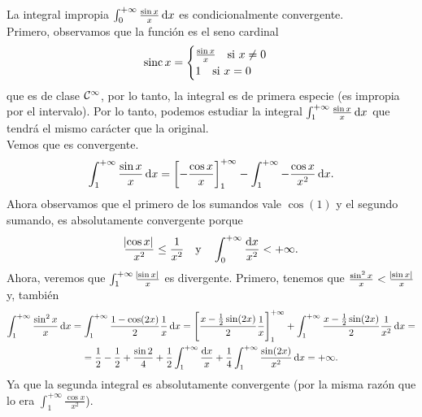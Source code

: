\begin{example*}
    La integral impropia $\int^{+\infty}_0 \frac{\sin x}{x} \dif x$ es
    condicionalmente convergente. \\
    Primero, observamos que la función es el seno cardinal
    \[
        \operatorname{sinc} x = \begin{cases} \frac{\sin x}{x} \quad \text{si } x \neq 0 \\
            1 \quad \text{si } x = 0 \end{cases}
    \]
    que es de clase $\mathcal{C}^{\infty}$, por lo tanto, la integral es de primera especie
    (es impropia por el intervalo). Por lo tanto, podemos estudiar la integral
    $\int^{+\infty}_1 \frac{\sin x}{x} \dif x$ que tendrá el mismo carácter que
    la original. \\
    Vemos que es convergente.
    \[
        \int^{+\infty}_1 \frac{\sin x}{x}\dif x =
        \left[-\frac{\cos x}{x}\right]^{+\infty}_1 - \int^{+\infty}_1 
        -\frac{\cos x}{x^2} \dif x.
    \]
    Ahora observamos que el primero de los sumandos vale $\cos(1)$ y el segundo
    sumando, es absolutamente convergente porque
    \[
        \frac{\abs{\cos x}}{x^2} \leq \frac{1}{x^2} \quad \text{y} \quad
        \int^{+\infty}_0 \frac{\dif x}{x^2} < +\infty.
    \]
    Ahora, veremos que $\int^{+\infty}_1 \frac{\abs{\sin x}}{x}$ es divergente.
    Primero, tenemos que $\frac{\sin^2 x}{x} < \frac{\abs{\sin x}}{x}$ y, tambi\'en
    \begin{gather*}
        \int^{+\infty}_1 \frac{\sin^2 x}{x} \dif x = \int^{+\infty}_1
        \frac{1 - \cos(2x)}{2} \frac{1}{x} \dif x = 
        \left[ \frac{x - \frac{1}{2}\sin(2x)}{2}\frac{1}{x} \right]^{+\infty}_1
        + \int^{+\infty}_1 \frac{x -\frac{1}{2}\sin(2x)}{2}\frac{1}{x^2}\dif x=
        \\ = \frac{1}{2} - \frac{1}{2} + \frac{\sin 2}{4} +
        \frac{1}{2}\int^{+\infty}_{1} \frac{\dif x}{x} + \frac{1}{4}
        \int^{+\infty}_1 \frac{\sin(2x)}{x^2} \dif x = +\infty.
    \end{gather*}
    Ya que la segunda integral es absolutamente convergente (por la misma razón que
    lo era $\int^{+\infty}_1 \frac{\cos x}{x^2}$).
\end{example*}
